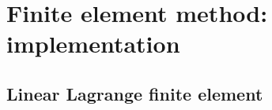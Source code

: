 \chapter{Finite element method: implementation}
\section{Linear Lagrange finite element}
\label{sec:fe_lin_tri}


